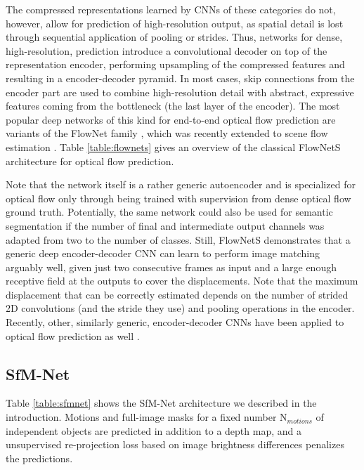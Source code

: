 The compressed representations learned by CNNs of these categories do not, however, allow
for prediction of high-resolution output, as spatial detail is lost through sequential application
of pooling or strides.
Thus, networks for dense, high-resolution, prediction introduce a convolutional decoder on top of the representation encoder,
performing upsampling of the compressed features and resulting in a encoder-decoder pyramid.
In most cases, skip connections from the encoder part are used to combine high-resolution
detail with abstract, expressive features coming from the bottleneck (the last layer of the encoder).
The most popular deep networks of this kind for end-to-end optical flow prediction
are variants of the FlowNet family \cite{FlowNet, FlowNet2},
which was recently extended to scene flow estimation \cite{SceneFlowDataset}.
Table \ref{table:flownets} gives an overview of the classical FlowNetS architecture for optical flow prediction.

Note that the network itself is a rather generic autoencoder and is specialized for optical flow only through being trained
with supervision from dense optical flow ground truth.
Potentially, the same network could also be used for semantic segmentation if
the number of final and intermediate output channels was adapted from two to the number of classes.
Still, FlowNetS demonstrates that a generic deep encoder-decoder CNN can learn to perform image matching arguably well,
given just two consecutive frames as input and a large enough receptive field at the outputs to cover the displacements.
Note that the maximum displacement that can be correctly estimated depends on the number of strided 2D convolutions (and the stride they use) and pooling
operations in the encoder.
Recently, other, similarly generic,
encoder-decoder CNNs have been applied to optical flow prediction as well \cite{DenseNetDenseFlow}.

\subsection{SfM-Net}
Table \ref{table:sfmnet} shows the SfM-Net architecture \cite{SfmNet} we described
in the introduction.
Motions and full-image masks for a fixed number N$_{motions}$ of independent objects
are predicted in addition to a depth map, and a unsupervised re-projection loss based on
image brightness differences penalizes the predictions.

